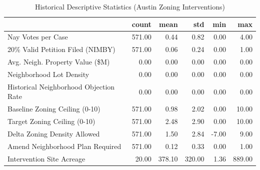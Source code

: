 \begin{table}[h]
\centering
\caption{Historical Descriptive Statistics (Austin Zoning Interventions)}
\label{tab:summary_stats}
\begin{tabular}{lrrrrr}
\toprule
 & count & mean & std & min & max \\
\midrule
Nay Votes per Case & 571.00 & 0.44 & 0.82 & 0.00 & 4.00 \\
20\% Valid Petition Filed (NIMBY) & 571.00 & 0.06 & 0.24 & 0.00 & 1.00 \\
Avg. Neigh. Property Value (\$M) & 0.00 & 0.00 & 0.00 & 0.00 & 0.00 \\
Neighborhood Lot Density & 0.00 & 0.00 & 0.00 & 0.00 & 0.00 \\
Historical Neighborhood Objection Rate & 0.00 & 0.00 & 0.00 & 0.00 & 0.00 \\
Baseline Zoning Ceiling (0-10) & 571.00 & 0.98 & 2.02 & 0.00 & 10.00 \\
Target Zoning Ceiling (0-10) & 571.00 & 2.48 & 2.90 & 0.00 & 10.00 \\
Delta Zoning Density Allowed & 571.00 & 1.50 & 2.84 & -7.00 & 9.00 \\
Amend Neighborhood Plan Required & 571.00 & 0.12 & 0.33 & 0.00 & 1.00 \\
Intervention Site Acreage & 20.00 & 378.10 & 320.00 & 1.36 & 889.00 \\
\bottomrule
\end{tabular}
\end{table}
